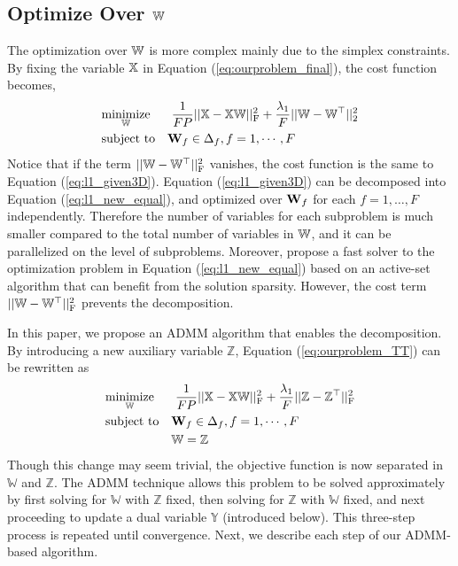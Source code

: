 \subsection{Optimize Over \texorpdfstring{$\mathbb W$}{optimizeoverallT}} \label{sec:initlization}
The optimization over $\mathbb W$ is more complex mainly due to the simplex constraints.
By fixing the variable $\mathbb X$ in Equation (\ref{eq:ourproblem_final}), the cost function becomes,
\begin{equation}
\begin{aligned}
& \underset{ \mathbb W }{\text{minimize}}&& ~ \frac{1}{FP} || \mathbb X - \mathbb X \mathbb W||_\text{F}^2
 + \frac{\lambda_1}{F} ||\mathbb W - \mathbb W^\top||_2^2 \\
& \text{subject to} && \mathbf W_f \in \Delta_f, f=1,\cdots,F
\end{aligned}
\label{eq:ourproblem_TT}
\end{equation}
Notice that if the term $||\mathbb W - \mathbb W^\top||_\text{F}^2$ vanishes, the cost function is the same to Equation (\ref{eq:l1_given3D}). Equation (\ref{eq:l1_given3D}) can be decomposed into Equation (\ref{eq:l1_new_equal}), and optimized over $\mathbf W_f$ for each $f=1,\dots,F$ independently.
Therefore the number of variables for each subproblem is much smaller compared to the total number of variables in $\mathbb W$, and it can be parallelized on the level of subproblems.
Moreover, \citet{chen:hal-00995911} propose a fast solver to the optimization problem in Equation (\ref{eq:l1_new_equal}) based on an active-set algorithm that can benefit from the solution sparsity.
However, the cost term $||\mathbb W - \mathbb W^\top||_\text{F}^2$ prevents the decomposition.

In this paper, we propose an ADMM algorithm that enables the decomposition.
By introducing a new auxiliary variable $\mathbb{Z}$, Equation (\ref{eq:ourproblem_TT}) can be rewritten as
\begin{equation}
\begin{aligned}
& \underset{ \mathbb W }{\text{minimize}}&& ~ \frac{1}{FP} || \mathbb X - \mathbb X \mathbb W||_\text{F}^2
 + \frac{\lambda_1}{F} ||\mathbb{Z} - \mathbb{Z}^\top||_\text{F}^2 \\
& \text{subject to} && \mathbf W_f \in \Delta_f, f=1,\cdots,F \\
&                   && \mathbb W = \mathbb{Z}
\end{aligned}
\end{equation}
Though this change may seem trivial, the objective function is now separated in $\mathbb{W}$ and $\mathbb{Z}$. 
The ADMM technique allows this problem to be solved approximately by first solving for $\mathbb{W}$ with $\mathbb{Z}$ fixed, then solving for $\mathbb{Z}$ with $\mathbb{W}$ fixed, and next proceeding to update a dual variable $\mathbb{Y}$ (introduced below). This three-step process is repeated until convergence. Next, we describe each step of our ADMM-based algorithm. 

